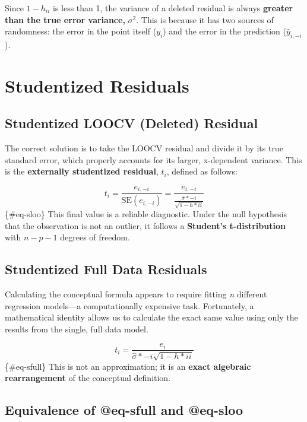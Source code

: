 \documentclass[
]{article}
\begin{document}
Since \(1-h_{ii}\) is less than 1, the variance of a deleted residual is
always \textbf{greater than the true error variance,} \(\sigma^2\). This
is because it has two sources of randomness: the error in the point
itself (\(y_i\)) and the error in the prediction (\(\hat{y}_{i,-i}\)).

\section{Studentized Residuals}\label{studentized-residuals}

\subsection{Studentized LOOCV (Deleted)
Residual}\label{studentized-loocv-deleted-residual}

The correct solution is to take the LOOCV residual and divide it by its
true standard error, which properly accounts for its larger, x-dependent
variance. This is the \textbf{externally studentized residual}, \(t_i\),
defined as follows:

\[
t_i = \frac{e_{i,-i}}{\text{SE}(e_{i,-i})} = \frac{e_{i,-i}}{\frac{\hat{\sigma}*{-i}}{\sqrt{1-h*{ii}}}}
\] \{\#eq-sloo\} This final value is a reliable diagnostic. Under the
null hypothesis that the observation is not an outlier, it follows a
\textbf{Student's t-distribution} with \(n - p - 1\) degrees of freedom.

\subsection{Studentized Full Data
Residuals}\label{studentized-full-data-residuals}

Calculating the conceptual formula appears to require fitting \emph{n}
different regression models---a computationally expensive task.
Fortunately, a mathematical identity allows us to calculate the exact
same value using only the results from the single, full data model.

\[
t_i = \frac{e_i}{\hat{\sigma}*{-i}\sqrt{1 - h*{ii}}}
\] \{\#eq-sfull\} This is not an approximation; it is an \textbf{exact
algebraic rearrangement} of the conceptual definition.

\subsection{Equivalence of @eq-sfull and
@eq-sloo}\label{equivalence-of-eq-sfull-and-eq-sloo}
\end{document}
